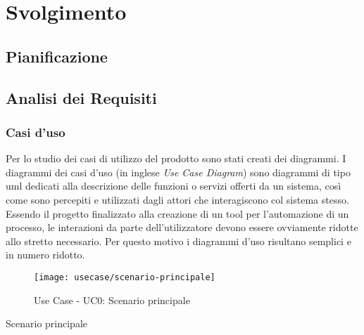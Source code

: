 
\chapter{Svolgimento}
\label{cap:svolgimento}


\section{Pianificazione}

\section{Analisi dei Requisiti}
	\subsection{Casi d'uso}
	
	Per lo studio dei casi di utilizzo del prodotto sono stati creati dei diagrammi.
	I diagrammi dei casi d'uso (in inglese \emph{Use Case Diagram}) sono diagrammi di tipo \gls{uml} dedicati alla descrizione delle funzioni o servizi offerti da un sistema, così come sono percepiti e utilizzati dagli attori che interagiscono col sistema stesso.
	Essendo il progetto finalizzato alla creazione di un tool per l'automazione di un processo, le interazioni da parte dell'utilizzatore devono essere ovviamente ridotte allo stretto necessario. Per questo motivo i diagrammi d'uso risultano semplici e in numero ridotto.
	
	\begin{figure}[!h] 
		\centering 
		\texttt{[image: usecase/scenario-principale]} 
		\caption{Use Case - UC0: Scenario principale}
	\end{figure}
	
	\begin{usecase}{0}{Scenario principale}
		\label{uc:scenario-principale}
	\end{usecase}
	
